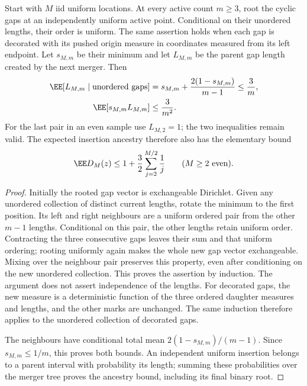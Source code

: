 \documentclass[11pt,letterpaper]{article}
\begin{document}
\begin{lemma}
\label{lem:gap-order}
Start with $M$ iid uniform locations. At every active count $m\ge3$,
root the cyclic gaps at an independently uniform active point.
Conditional on their unordered lengths, their order is uniform.
The same assertion holds when each gap is decorated with its pushed
origin measure in coordinates measured from its left endpoint.
Let $s_{M,m}$ be their minimum and let $L_{M,m}$ be the parent gap
length created by the next merger. Then
\begin{align}
 \EE[L_{M,m}\mid\hbox{unordered gaps}]
   &=s_{M,m}+\frac{2(1-s_{M,m})}{m-1}
       \le\frac3m,\label{eq:parent-mean}\\
 \EE[s_{M,m}L_{M,m}]&\le\frac3{m^2}.
 \label{eq:weighted-parent}
\end{align}
For the last pair in an even sample use $L_{M,2}=1$; the two
inequalities remain valid. The expected insertion ancestry therefore
also has the elementary bound
\[
 \EE D_M(z)\le1+\frac32\sum_{j=2}^{M/2}\frac1j
 \qquad(M\ge2\hbox{ even}).
\]
\end{lemma}
\begin{proof}
Initially the rooted gap vector is exchangeable Dirichlet. Given
any unordered collection of distinct current lengths, rotate the
minimum to the first position. Its left and right neighbours are
a uniform ordered pair from the other $m-1$ lengths. Conditional
on this pair, the other lengths retain uniform order. Contracting
the three consecutive gaps leaves their sum and that uniform
ordering; rooting uniformly again makes the whole new gap vector
exchangeable. Mixing over the neighbour pair preserves this
property, even after conditioning on the new unordered collection.
This proves the assertion by induction. The argument does not
assert independence of the lengths.
For decorated gaps, the new measure is a deterministic function of
the three ordered daughter measures and lengths, and the other marks
are unchanged. The same induction therefore applies to the unordered
collection of decorated gaps.

The neighbours have conditional total mean $2(1-s_{M,m})/(m-1)$.
Since $s_{M,m}\le1/m$, this proves both bounds.
An independent uniform insertion belongs to a parent interval with
probability its length; summing these probabilities over the merger
tree proves the ancestry bound, including its final binary root.
\end{proof}
\end{document}

